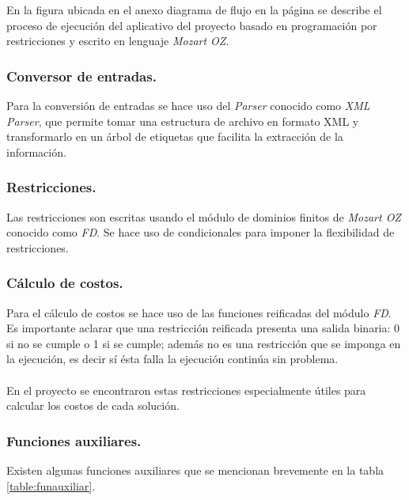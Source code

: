 En la figura ubicada en el anexo diagrama de flujo en la página \pageref{flujoApp} se describe el proceso de ejecución del aplicativo del proyecto basado en programación por restricciones y escrito en lenguaje \textit{Mozart OZ}. 

\subsubsection{Conversor de entradas.} \label{sec:convEntCPP}

Para la conversión de entradas se hace uso del \textit{Parser} conocido como \textit{XML Parser}, que permite tomar una estructura de archivo en formato XML y transformarlo en un árbol de etiquetas que facilita la extracción de la información.

\subsubsection{Restricciones.}

Las restricciones son escritas usando el módulo de dominios finitos de \textit{Mozart OZ} conocido como \textit{FD}. Se hace uso de condicionales para imponer la flexibilidad de restricciones.

\subsubsection{Cálculo de costos.}

Para el cálculo de costos se hace uso de las funciones reificadas del módulo \textit{FD}. Es importante aclarar que una restricción reificada presenta una salida binaria: 0 si no se cumple o 1 si se cumple; además no es una restricción que se imponga en la ejecución, es decir sí ésta falla la ejecución continúa sin problema.
\\\\
En el proyecto se encontraron estas restricciones especialmente útiles para calcular los costos de cada solución.

\subsubsection{Funciones auxiliares.}

Existen algunas funciones auxiliares que se mencionan brevemente en la tabla \ref{table:funauxiliar}.

